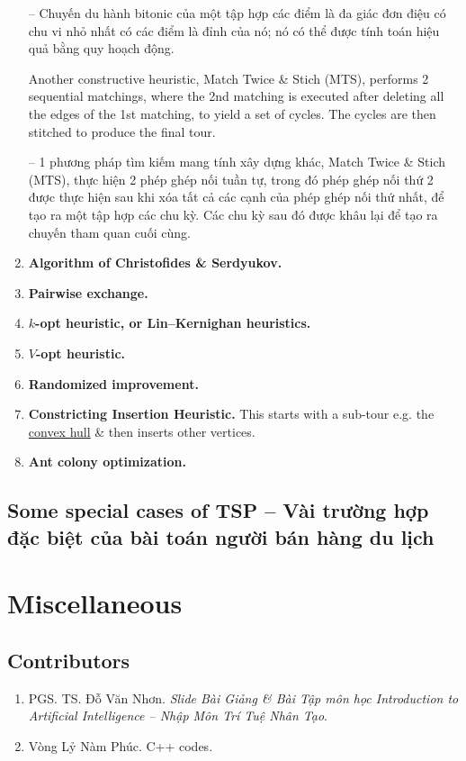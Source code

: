 \documentclass{article}
\begin{document}
\begin{enumerate}
    -- Chuyến du hành bitonic của một tập hợp các điểm là đa giác đơn điệu có chu vi nhỏ nhất có các điểm là đỉnh của nó; nó có thể được tính toán hiệu quả bằng quy hoạch động.
    
    Another constructive heuristic, Match Twice \& Stich (MTS), performs 2 sequential matchings, where the 2nd matching is executed after deleting all the edges of the 1st matching, to yield a set of cycles. The cycles are then stitched to produce the final tour.
    
    -- 1 phương pháp tìm kiếm mang tính xây dựng khác, Match Twice \& Stich (MTS), thực hiện 2 phép ghép nối tuần tự, trong đó phép ghép nối thứ 2 được thực hiện sau khi xóa tất cả các cạnh của phép ghép nối thứ nhất, để tạo ra một tập hợp các chu kỳ. Các chu kỳ sau đó được khâu lại để tạo ra chuyến tham quan cuối cùng.
    \item {\bf Algorithm of {\sc Christofides \& Serdyukov}.}
    \item {\bf Pairwise exchange.}
    \item {\bf$k$-opt heuristic, or Lin--Kernighan heuristics.}
    \item {\bf$V$-opt heuristic.}
    \item {\bf Randomized improvement.}
    \item {\bf Constricting Insertion Heuristic.} This starts with a sub-tour e.g. the \href{https://en.wikipedia.org/wiki/Convex_hull}{convex hull} \& then inserts other vertices.
    \item {\bf Ant colony optimization.}
\end{enumerate}


\subsection{Some special cases of TSP -- Vài trường hợp đặc biệt của bài toán người bán hàng du lịch}


\section{Miscellaneous}

\subsection{Contributors}

\begin{enumerate}
	\item PGS. TS. {\sc Đỗ Văn Nhơn}. {\it Slide Bài Giảng \& Bài Tập môn học Introduction to Artificial Intelligence -- Nhập Môn Trí Tuệ Nhân Tạo}.
    
	\item {\sc Vòng Lỷ Nàm Phúc.} C++ codes.
\end{enumerate}


\printbibliography[heading=bibintoc]
	
\end{document}
